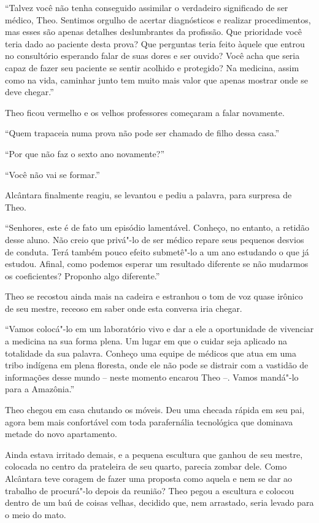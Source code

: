``Talvez você não tenha conseguido assimilar o verdadeiro significado de
ser médico, Theo. Sentimos orgulho de acertar diagnósticos e realizar
procedimentos, mas esses são apenas detalhes deslumbrantes da profissão.
Que prioridade você teria dado ao paciente desta prova? Que perguntas
teria feito àquele que entrou no consultório esperando falar de suas
dores e ser ouvido? Você acha que seria capaz de fazer seu paciente se
sentir acolhido e protegido? Na medicina, assim como na vida, caminhar
junto tem muito mais valor que apenas mostrar onde se deve chegar.''

Theo ficou vermelho e os velhos professores começaram a falar novamente.

``Quem trapaceia numa prova não pode ser chamado de filho dessa casa.''

``Por que não faz o sexto ano novamente?''

``Você não vai se formar.''

Alcântara finalmente reagiu, se levantou e pediu a palavra, para
surpresa de Theo.

``Senhores, este é de fato um episódio lamentável. Conheço, no entanto,
a retidão desse aluno. Não creio que privá"-lo de ser médico repare seus
pequenos desvios de conduta. Terá também pouco efeito submetê"-lo a um
ano estudando o que já estudou. Afinal, como podemos esperar um
resultado diferente se não mudarmos os coeficientes? Proponho algo
diferente.''

Theo se recostou ainda mais na cadeira e estranhou o tom de voz quase irônico de
seu mestre, receoso em saber onde esta conversa iria chegar.

``Vamos colocá"-lo em um laboratório vivo e dar a ele a oportunidade de
vivenciar a medicina na sua forma plena. Um lugar em que o cuidar seja
aplicado na totalidade da sua palavra. Conheço uma equipe de médicos que
atua em uma tribo indígena em plena floresta, onde ele não pode se
distrair com a vastidão de informações desse mundo -- neste momento
encarou Theo --. Vamos mandá"-lo para a Amazônia.''

\asterisc

Theo chegou em casa chutando os móveis. Deu uma checada rápida em seu
pai, agora bem mais confortável com toda parafernália tecnológica que
dominava metade do novo apartamento.

Ainda estava irritado demais, e a pequena escultura que ganhou de seu
mestre, colocada no centro da prateleira de seu quarto, parecia zombar
dele. Como Alcântara teve coragem de fazer uma proposta como aquela e
nem se dar ao trabalho de procurá"-lo depois da reunião? Theo pegou a escultura e
colocou dentro de um baú de coisas velhas, decidido que, nem arrastado,
seria levado para o meio do mato.

